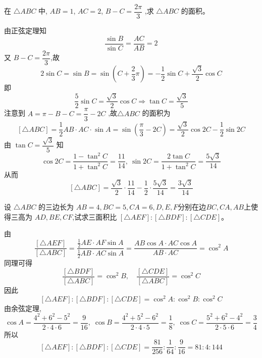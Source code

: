 \begin{questions}
    \question 在 $\triangle ABC$ 中, $AB=1$, $AC=2$, $B-C=\dfrac{2\pi}{3}$ ,求 $\triangle ABC$ 的面积。
    \begin{solution}
        由正弦定理知 
        \[
        \frac{\sin B}{\sin C}=\frac{AC}{AB}=2
        \]
        又 $B-C=\dfrac{2\pi}{3}$,故
        \[
        2\sin C=\sin B=\sin(C+\frac{2}{3}\pi)=-\frac{1}{2}\sin C+\frac{\sqrt{3}}{2}\cos C
        \]
        即 
        \[
        \frac{5}{2}\sin C=\frac{\sqrt{3}}{2}\cos C\Rightarrow\tan C=\frac{\sqrt{3}}{5}
        \]
        注意到 $A=\pi-B-C=\dfrac{\pi}{3}-2C$ ,故$\triangle ABC$ 的面积为
        \[
        [\triangle ABC]=\frac{1}{2}AB\cdot AC\cdot \sin A=\sin \left(\frac{\pi}{3}-2C\right)=\frac{\sqrt{3}}{2}\cos 2C-\frac{1}{2}\sin 2C
        \]
        由 $\tan C=\dfrac{\sqrt{3}}{5}$ 知 
        \[
        \cos 2C=\frac{1-\tan^2 C}{1+\tan^2 C}=\frac{11}{14},\ \sin 2C=\frac{2\tan C}{1+\tan^2 C}=\frac{5\sqrt{3}}{14}
        \]
        从而
        \[
        [\triangle ABC]=\frac{\sqrt{3}}{2}\cdot\frac{11}{14}-\frac{1}{2}\cdot\frac{5\sqrt{3}}{14}=\frac{3\sqrt{3}}{14}\]
    \end{solution}

    \question 设 $\triangle ABC$ 的三边长为 $AB=4, BC=5, CA=6,D,E,F$分别在边$BC,CA,AB$上使得三高为 $AD, BE, CF$,试求三面积比 $[\triangle AEF] : [\triangle BDF] : [\triangle CDE]$。
    \begin{solution}
        由
        \[
        \frac{[\triangle AEF]}{[\triangle ABC]} 
        =\frac{\frac12 AE \cdot AF \sin  A}{\frac12 AB \cdot AC \sin  A}
        =\frac{AB \cos  A \cdot AC \cos  A}{AB \cdot AC} 
        =\cos^2  A
        \]
        同理可得
        \[
        \frac{[\triangle BDF]}{[\triangle ABC]} = \cos^2  B,\quad \frac{[\triangle CDE]}{[\triangle ABC]} = \cos^2 C
        \]
        因此
        \[
        [\triangle AEF] : [\triangle BDF] : [\triangle CDE] = \cos^2  A : \cos^2  B : \cos^2  C
        \]
        由余弦定理,
        \[
        \cos  A = \frac{4^2+6^2-5^2}{2\cdot4\cdot6} = \frac{9}{16},\;
        \cos  B = \frac{4^2+5^2-6^2}{2\cdot4\cdot5} = \frac{1}{8},\;
        \cos  C = \frac{5^2+6^2-4^2}{2\cdot5\cdot6} = \frac{3}{4}
        \]
        所以
        \[
        [\triangle AEF] : [\triangle BDF] : [\triangle CDE] = \frac{81}{256} : \frac{1}{64} : \frac{9}{16} = 81 : 4 : 144
        \]
    \end{solution}


\end{questions}
